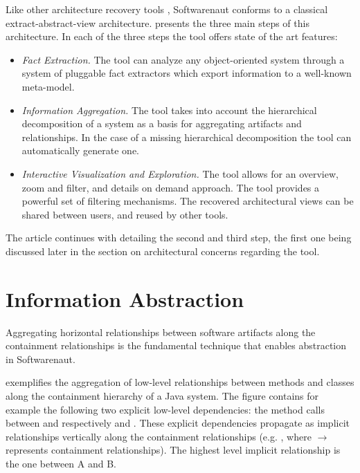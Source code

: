 \documentclass[preprint,12pt]{elsarticle}
\begin{document}
Like other architecture recovery tools \cite{pollet-sar}, Softwarenaut conforms to a classical extract-abstract-view architecture.  presents the three main steps of this architecture. In each of the three steps the tool offers state of the art features:

\begin{itemize}
\item {\em Fact Extraction.} The tool can analyze any object-oriented system through a system of pluggable fact extractors which export information to a well-known meta-model. 
\item {\em Information Aggregation.} The tool takes into account the hierarchical decomposition of a system as a basis for aggregating artifacts and relationships. In the case of a missing hierarchical decomposition the tool can automatically generate one.
\item {\em Interactive Visualization and Exploration.} The tool allows for an overview, zoom and filter, and details on demand approach. The tool provides a powerful set of filtering mechanisms. The recovered architectural views can be shared between users, and reused by other tools.
\end{itemize}

The article continues with detailing the second and third step, the first one being discussed later in the section on architectural concerns regarding the tool.



\section {Information Abstraction} \label{sec:org}

Aggregating horizontal relationships between software artifacts along the containment relationships is the fundamental technique that enables abstraction in Softwarenaut. 

 exemplifies the aggregation of low-level relationships between methods and classes along the containment hierarchy of a Java system. 
The figure contains for example the following two explicit low-level dependencies: the method calls between  and respectively  and . These explicit dependencies propagate as implicit relationships vertically along the containment relationships (e.g. , where $\rightarrow$ represents containment relationships). The highest level implicit relationship is the one between A and B. 
\end{document}
